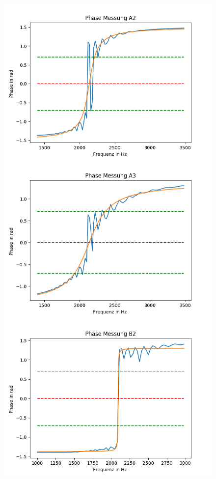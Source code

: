 \documentclass[12pt,a4paper]{article}
\begin{document}
\begin{figure}[h]
\centering
\includegraphics[scale=0.7]{Bilder/Parallel_Phase_2.png}
\includegraphics[scale=0.7]{Bilder/Parallel_Phase_3.png}
\includegraphics[scale=0.7]{Bilder/Parallel_PhaseB_2.png}
\end{figure}
\end{document}
